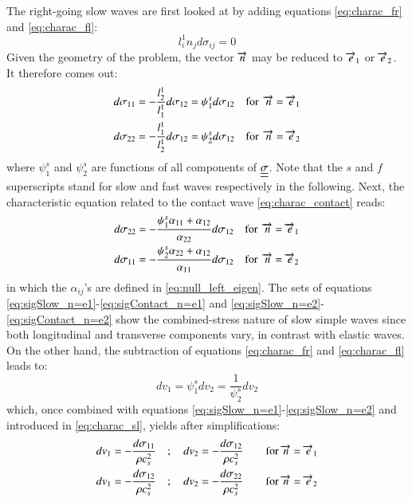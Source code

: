 The right-going slow waves are first looked at by adding equations \eqref{eq:charac_fr} and \eqref{eq:charac_fl}:
\begin{equation}
  l_i^1 n_j d\sigma_{ij}=0
\end{equation}
Given the geometry of the problem, the vector ${\overrightarrow{n}}$ may be reduced to ${\overrightarrow{e}}_1$ or ${\overrightarrow{e}}_2$.
It therefore comes out:
\begin{align}
  \label{eq:sigSlow_n=e1}
  & d\sigma_{11} = - \frac{l^1_2}{l_1^1} d\sigma_{12} = \psi^s_{1}d\sigma_{12}  \quad \text{for } \:{\overrightarrow{n}}={\overrightarrow{e}}_1 \\
  \label{eq:sigSlow_n=e2}
  & d\sigma_{22}=- \frac{l_1^1}{l_2^1}  d\sigma_{12} = \psi^s_{2}d\sigma_{12} \quad \text{for } \:{\overrightarrow{n}}={\overrightarrow{e}}_2
\end{align}
where $\psi^s_1$ and $\psi^s_2$ are functions of all components of ${\underline{\underline{\sigma}}}$. 
Note that the $s$ and $f$ superscripts stand for slow and fast waves respectively in the following.
Next, the characteristic equation related to the contact wave \eqref{eq:charac_contact} reads:
\begin{align}
    \label{eq:sigContact_n=e1}
    & d\sigma_{22} = -\frac{\psi^s_{1}\alpha_{11}+\alpha_{12}}{\alpha_{22}}d\sigma_{12}  \quad \text{for } \:{\overrightarrow{n}}={\overrightarrow{e}}_1 \\
    \label{eq:sigContact_n=e2}
    & d\sigma_{11}= -\frac{\psi^s_{2}\alpha_{22}+\alpha_{12}}{\alpha_{11}} d\sigma_{12}  \quad \text{for } \:{\overrightarrow{n}}={\overrightarrow{e}}_2
\end{align}
in which the $\alpha_{ij}$'s are defined in \eqref{eq:null_left_eigen}.
The sets of equations \eqref{eq:sigSlow_n=e1}-\eqref{eq:sigContact_n=e1} and \eqref{eq:sigSlow_n=e2}-\eqref{eq:sigContact_n=e2} show the combined-stress nature of slow simple waves since both longitudinal and transverse components vary, in contrast with elastic waves.
On the other hand, the subtraction of equations \eqref{eq:charac_fr} and \eqref{eq:charac_fl} leads to:
\begin{equation*}
  dv_1 = \psi^s_{1}dv_2 = \frac{1}{\psi^s_2}dv_2
\end{equation*}
which, once combined with equations \eqref{eq:sigSlow_n=e1}-\eqref{eq:sigSlow_n=e2} and introduced in \eqref{eq:charac_sl}, yields after simplifications:
\begin{align}
    \label{eq:vSlow_n=e1}
    & dv_1 = -\frac{d\sigma_{11}}{\rho c_s^2} \quad ;\quad  dv_2 = -\frac{d\sigma_{12}}{\rho c_s^2} \qquad  \text{for } {\overrightarrow{n}}={\overrightarrow{e}}_1\\
    \label{eq:vSlow_n=e2}
    & dv_1 = -\frac{d\sigma_{12}}{\rho c_s^2} \quad ;\quad  dv_2 = -\frac{d\sigma_{22}}{\rho c_s^2} \qquad  \text{for } {\overrightarrow{n}}={\overrightarrow{e}}_2
\end{align}

